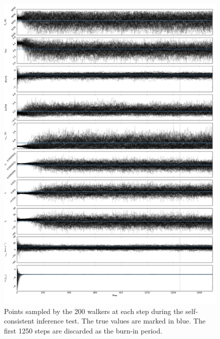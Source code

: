 \documentclass{aastex}
\begin{document}
\begin{figure}
\label{fig:chains}
\includegraphics[height=\textheight]{chains.pdf}
\caption{Points sampled by the 200 walkers at each step during the self-consistent inference test. The true values are marked in blue. The first 1250 steps are discarded as the burn-in period.}
\end{figure}
\end{document}
